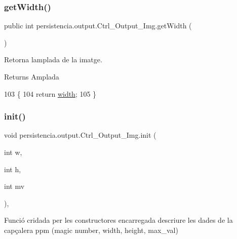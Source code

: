 \subsubsection{\texorpdfstring{get\+Width()}{getWidth()}}
{\footnotesize\ttfamily public int persistencia.\+output.\+Ctrl\+\_\+\+Output\+\_\+\+Img.\+get\+Width (\begin{DoxyParamCaption}{ }\end{DoxyParamCaption})\hspace{0.3cm}{\ttfamily [inline]}}



Retorna l\textquotesingle{}amplada de la imatge. 

\begin{DoxyReturn}{Returns}
Amplada 
\end{DoxyReturn}

\begin{DoxyCode}
103                           \{
104         \textcolor{keywordflow}{return} \hyperlink{classpersistencia_1_1output_1_1Ctrl__Output__Img_ae4a01ec459078cece4815d2fe7db8a64}{width};
105     \}
\end{DoxyCode}
\mbox{\label{classpersistencia_1_1output_1_1Ctrl__Output__Img_aab3258280bd6abb81d580c93eb68fb28}} 
\subsubsection{\texorpdfstring{init()}{init()}}
{\footnotesize\ttfamily void persistencia.\+output.\+Ctrl\+\_\+\+Output\+\_\+\+Img.\+init (\begin{DoxyParamCaption}\item[{int}]{w,  }\item[{int}]{h,  }\item[{int}]{mv }\end{DoxyParamCaption})\hspace{0.3cm}{\ttfamily [inline]}, {\ttfamily [private]}}



Funció cridada per les constructores encarregada d\textquotesingle{}escriure les dades de la capçalera ppm (magic number, width, height, max\+\_\+val) 


